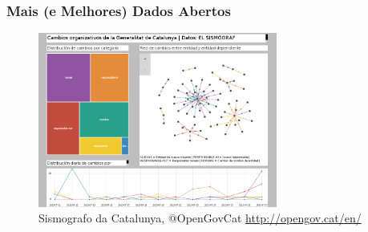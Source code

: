 \documentclass[hyperref={pdfpagelabels=true}]{beamer}
\begin{document}



\begin{frame}
\frametitle{Mais (e Melhores) Dados Abertos}

          
        
        
       \begin{figure}   
            \includegraphics[width=0.7\textwidth]{sism.png}
            \caption{Sismografo da Catalunya, @OpenGovCat \url{http://opengov.cat/en/}}         
        \end{figure} 
 
\end{frame}
\end{document}
